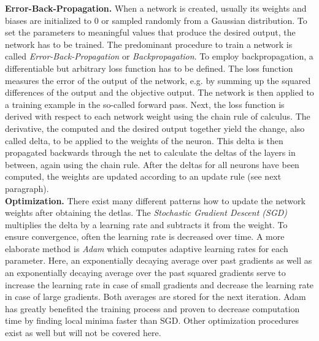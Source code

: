 \textbf{Error-Back-Propagation.} When a network is created, usually its weights and biases are initialized to 0 or sampled randomly from a Gaussian distribution. To set the parameters to meaningful values that produce the desired output, the network has to be trained. The predominant procedure to train a network is called \textit{Error-Back-Propagation} or \textit{Backpropagation}. To employ backpropagation, a differentiable but arbitrary loss function has to be defined. The loss function measures the error of the output of the network, e.g. by summing up the squared differences of the output and the objective output. The network is then applied to a training example in the so-called forward pass. Next, the loss function is derived with respect to each network weight using the chain rule of calculus. The derivative, the computed and the desired output together yield the change, also called delta, to be applied to the weights of the neuron. This delta is then propagated backwards through the net to calculate the deltas of the layers in between, again using the chain rule. After the deltas for all neurons have been computed, the weights are updated according to an update rule (see next paragraph). 
\\

\noindent\textbf{Optimization.} There exist many different patterns how to update the network weights after obtaining the detlas. The \textit{Stochastic Gradient Descent (SGD)} multiplies the delta by a learning rate and subtracts it from the weight. To ensure convergence, often the learning rate is decreased over time. A more elaborate method is \textit{Adam} \cite{adam} which computes adaptive learning rates for each parameter. Here, an exponentially decaying average over past gradients as well as an exponentially decaying average over the past squared gradients serve to increase the learning rate in case of small gradients and decrease the learning rate in case of large gradients. Both averages are stored for the next iteration. Adam has greatly benefited the training process and proven to decrease computation time by finding local minima faster than SGD. Other optimization procedures exist as well but will not be covered here.
\\	
	
